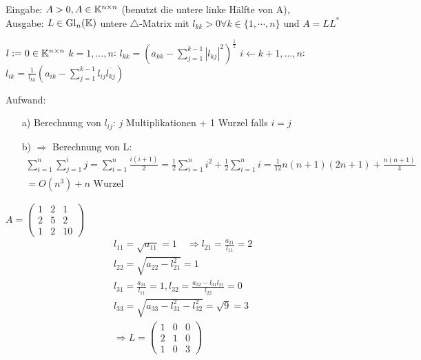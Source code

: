 \begin{Algorithmus}\hfill\newline
	Eingabe: $A > 0, A \in \mathbb K^{n\times n}$ (benutzt die \glqq untere linke Hälfte \grqq von A),\\
	Ausgabe: $ L \in \mathrm{Gl}_n(\mathbb K)$ untere $\triangle$-Matrix mit $l_{kk} >0 \forall k\in \{1,\cdots,n\} \text{ und } A=LL^*$ 
	\quad
	\begin{codebox}
		\li $l := 0 \in \mathbb K^{n\times n}$
		\li \For $k = 1, \ldots, n$:
		\Do
		\li $l_{kk} = \left(a_{kk} - \sum_{j=1}^{k-1}|l_{kj}|^{2}\right)^{\frac{1}{2}}$
		\li \For $i \gets k + 1, \ldots, n$:
		\Do
		\li $l_{ik} =\frac{1}{l_{kk}} \left(a_{ik} - \sum_{j=1}^{k-1}l_{ij}\overline{l_{kj}}\right)$
		\End
		\End
	\end{codebox}
\end{Algorithmus}
Aufwand:\begin{itemize}
	\item[a)] Berechnung von $l_{ij}$: $j$ Multiplikationen + 1 Wurzel falls $i=j$ 	\item[b)]$\Rightarrow$ Berechnung von L:\begin{align*}
	\sum_{i=1}^{n}\sum_{j=1}^{i}j = \sum_{i=1}^{n} \frac{i(i+1)}{2}= \frac{1}{2}\sum_{i=1}^{n} i^2 + \frac{1}{2} \sum_{i=1}^{n} i = \frac{1}{12}n(n+1)(2n+1)+\frac{n(n+1)}{4}  \\= O(n^3) + n\text{ Wurzel}
	\end{align*}
\end{itemize}
\begin{Beispiel}
	\quad
	$A = \begin{pmatrix}
	1 & 2 & 1\\
	2 & 5 & 2\\
	1 & 2 & 10
	\end{pmatrix}$\\
	\begin{align*}&l_{11}= \sqrt{a_{11}} = 1 \quad\Rightarrow l_{21}=\frac{a_{21}}{l_{11}}=2\\
	&l_{22}= \sqrt{a_{22}-l_{21}^2} = 1\\
	&l_{31}= \frac{a_{31}}{l_{11}} = 1, l_{32}= \frac{a_{32}-l_{31}l_{21}}{l_{22}} = 0\\
	&l_{33}= \sqrt{a_{33}-l_{31}^2-l_{32}^2} = \sqrt{9}=3\\
	&\Rightarrow L = \begin{pmatrix}
	1 & 0 & 0\\
	2 & 1 & 0\\
	1 & 0 & 3
	\end{pmatrix}
	\end{align*}
\end{Beispiel}


